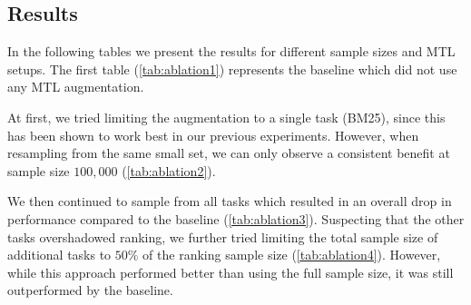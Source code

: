 \subsection{Results}
In the following tables we present the results for different sample sizes and MTL setups. The first table (\autoref{tab:ablation1}) represents the baseline which did not use any MTL augmentation.

At first, we tried limiting the augmentation to a single task (BM25), since this has been shown to work best in our previous experiments. However, when resampling from the same small set, we can only observe a consistent benefit at sample size $100,000$ (\autoref{tab:ablation2}).

We then continued to sample from all tasks which resulted in an overall drop in performance compared to the baseline (\autoref{tab:ablation3}). Suspecting that the other tasks overshadowed ranking, we further tried limiting the total sample size of additional tasks to $50\%$ of the ranking sample size (\autoref{tab:ablation4}). However, while this approach performed better than using the full sample size, it was still outperformed by the baseline.

